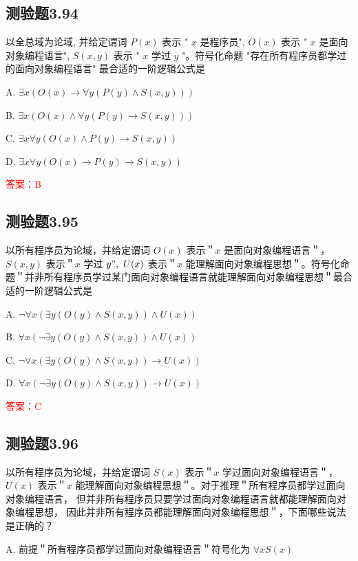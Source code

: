\documentclass[UTF8, heading=true]{ctexart}
\begin{document}
\subsection{测验题3.94}

以全总域为论域, 并给定谓词 $P(x)$ 表示 " $x$ 是程序员", $O(x)$ 表示 " $x$ 是面向对象编程语言", $S(x, y)$ 表示 " $x$ 学过 $y$ "。符号化命题 "存在所有程序员都学过的面向对象编程语言" 最合适的一阶逻辑公式是 $\qquad$

A. $\exists x(O(x) \rightarrow \forall y(P(y) \wedge S(x, y)))$

B. $\exists x(O(x) \wedge \forall y(P(y) \rightarrow S(x, y)))$

C. $\exists x \forall y(O(x) \wedge P(y) \rightarrow S(x, y))$

D. $\exists x \forall y(O(x) \rightarrow P(y) \rightarrow S(x, y))$

\textcolor{red}{答案：B}


\subsection{测验题3.95}

以所有程序员为论域，并给定谓词 $O(x)$ 表示＂$x$ 是面向对象编程语言＂，$S(x, y)$ 表示＂$x$ 学过 $y ", ~ U(x)$ 表示＂$x$ 能理解面向对象编程思想＂。符号化命题＂并非所有程序员学过某门面向对象编程语言就能理解面向对象编程思想＂最合适的一阶逻辑公式是 $\qquad$

A. $
\neg \forall x(\exists y(O(y) \wedge S(x, y)) \wedge U(x))
$


B. $
\forall x(\neg \exists y(O(y) \wedge S(x, y)) \wedge U(x))
$


C. $
\neg \forall x(\exists y(O(y) \wedge S(x, y)) \rightarrow U(x))
$


D. $
\forall x(\neg \exists y(O(y) \wedge S(x, y)) \rightarrow U(x))
$

\textcolor{red}{答案：C}

\subsection{测验题3.96}

以所有程序员为论域，并给定谓词 $S(x)$ 表示＂$x$ 学过面向对象编程语言＂，$U(x)$ 表示＂$x$ 
能理解面向对象编程思想＂。对于推理＂所有程序员都学过面向对象编程语言，
但并非所有程序员只要学过面向对象编程语言就都能理解面向对象编程思想，
因此并非所有程序员都能理解面向对象编程思想＂，下面哪些说法是正确的？

A. 前提＂所有程序员都学过面向对象编程语言＂符号化为 $\forall x S(x)$
\end{document}
